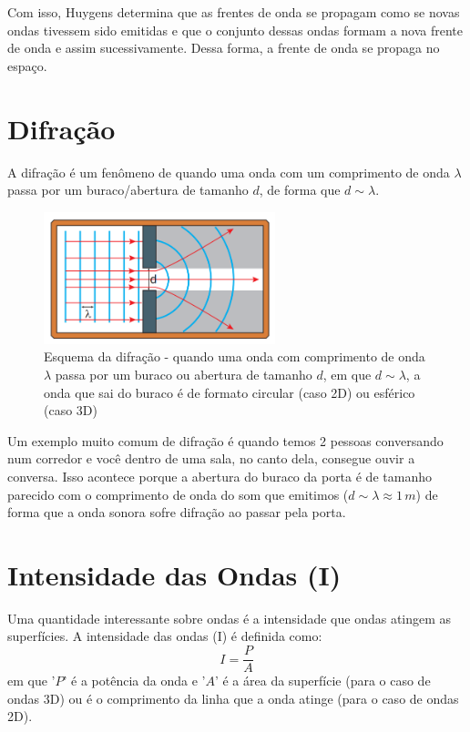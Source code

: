 \documentclass[12pt]{extarticle}
\newcommand{\<}{\langle}
\renewcommand{\>}{\rangle}
\theoremstyle{definition}
\begin{document}
Com isso, Huygens determina que as frentes de onda se propagam como se novas ondas tivessem sido emitidas e que o conjunto dessas ondas formam a nova frente de onda e assim sucessivamente. Dessa forma, a frente de onda se propaga no espaço.

\section{Difração}
A difração é um fenômeno de quando uma onda com um comprimento de onda $\lambda$ passa por um buraco/abertura de tamanho $d$, de forma que $d\sim\lambda$.

\begin{figure}[H]
    \centering
    \includegraphics[width=0.6\textwidth]{difracao.png}
    \caption{Esquema da difração - quando uma onda com comprimento de onda $\lambda$ passa por um buraco ou abertura de tamanho $d$, em que $d\sim \lambda$, a onda que sai do buraco é de formato circular (caso 2D) ou esférico (caso 3D)}
    \label{fig:difracao}
\end{figure}

Um exemplo muito comum de difração é quando temos 2 pessoas conversando num corredor e você dentro de uma sala, no canto dela, consegue ouvir a conversa. Isso acontece porque a abertura do buraco da porta é de tamanho parecido com o comprimento de onda do som que emitimos ($d\sim\lambda \approx 1\,m$)  de forma que a onda sonora sofre difração ao passar pela porta.

\section{Intensidade das Ondas (I)}
Uma quantidade interessante sobre ondas é a intensidade que ondas atingem as superfícies. A intensidade das ondas (I) é definida como:
\begin{equation}
    I = \frac{P}{A}
\end{equation}
\noindent em que '$P$' é a potência da onda e '$A$' é a área da superfície (para o caso de ondas 3D) ou é o comprimento da linha que a onda atinge (para o caso de ondas 2D).
\end{document}

